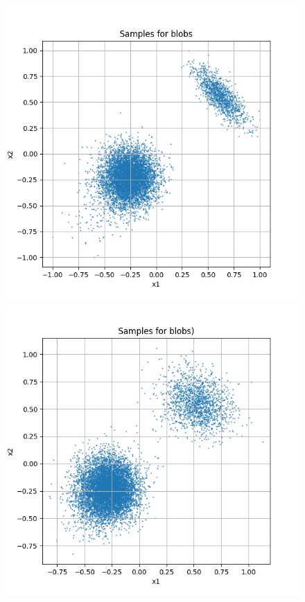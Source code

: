\documentclass[a4paper,12pt]{article}
\begin{document}
\begin{figure}[H]
  \centering
  \begin{minipage}{0.3\textwidth}
      \centering
      \includegraphics[width=\linewidth]{images/blobs.png}
  \end{minipage}
  \begin{minipage}{0.3\textwidth}
      \centering
      \includegraphics[width=\linewidth]{"images/Samples for ddpm_2_200_0.0001_0.02_blobs_linear.png"}

\end{minipage}
\end{figure}
\end{document}
